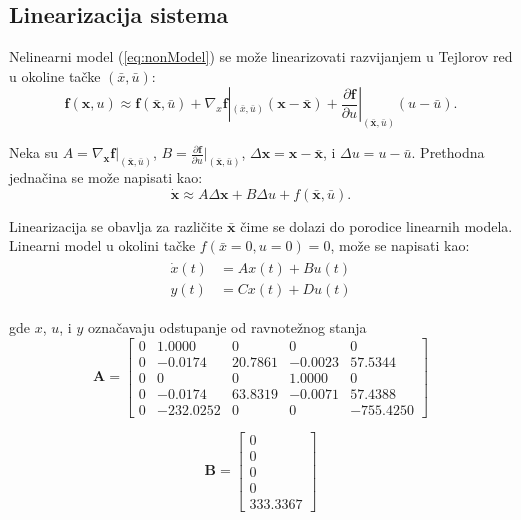 \documentclass[a4paper,11pt]{article}
\theoremstyle{definition} \newtheorem{deff}{Definicija}[section]
\theoremstyle{definition} \newtheorem{prim}[deff]{Primer}
\theoremstyle{plain} \newtheorem{teor}[deff]{Teorema}
\begin{document}
	\clearpage 
	\subsection{Linearizacija sistema}
	\label{sec:linearizacija}
	
	Nelinearni model (\ref{eq:nonModel}) se može linearizovati razvijanjem u Tejlorov red u okoline tačke $(\bar{x}, \bar{u})$:
	\begin{equation}
		\mathbf{f}(\mathbf{x}, u) \approx \mathbf{f}(\mathbf{\bar{x}}, \bar{u}) + \nabla_x \mathbf{f}|_{(\bar{x},\bar{u})} (\mathbf{x} - \mathbf{\bar{x}}) + \frac{\partial \mathbf{f}}{\partial u}|_{(\mathbf{\bar{x}},\bar{u})} (u - \bar{u}). \label{eq:linearization}
	\end{equation}
	
	Neka su $A = \nabla_{\mathbf{x}} \mathbf{f}|_{(\bar{\mathbf{x}},\bar{u})}$, $B = \frac{\partial \mathbf{f}}{\partial u}|_{(\bar{\mathbf{x}},\bar{u})}$, $\Delta \mathbf{x} = \mathbf{x} - \bar{\mathbf{x}}$, i $\Delta u = u - \bar{u}$.
	Prethodna jednačina se može napisati kao:
	\begin{equation}
		\dot{\mathbf{x}} \approx A\Delta \mathbf{x} + B\Delta u + f(\bar{\mathbf{x}}, \bar{u}). \label{eq:linearized_system}
	\end{equation}
	
	Linearizacija se obavlja za različite $\bar{\mathbf{x}}$ čime se dolazi do porodice linearnih modela. Linearni model u okolini tačke  $f(\bar{x} = 0, u = 0) = 0$, može se napisati kao:
	\begin{align}
		\begin{split}
			\dot{x}(t) &= Ax(t) + Bu(t) \\
			y(t) &= Cx(t) + Du(t)
		\end{split}
		\label{eg:lin_mod}
	\end{align}
	
	
	gde  $x$, $u$, i $y$ označavaju odstupanje od ravnotežnog stanja
	\[
	\mathbf{A} =
	\begin{bmatrix}
		0 & 1.0000 & 0 & 0 & 0 \\
		0 & -0.0174 & 20.7861 & -0.0023 & 57.5344 \\
		0 & 0 & 0 & 1.0000 & 0 \\
		0 & -0.0174 & 63.8319 & -0.0071 & 57.4388 \\
		0 & -232.0252 & 0 & 0 & -755.4250
	\end{bmatrix}
	\]
	
	\[
	\mathbf{B} =
	\begin{bmatrix}
		0 \\
		0 \\
		0 \\
		0 \\
		333.3367
	\end{bmatrix}
	\]
	
\end{document}

